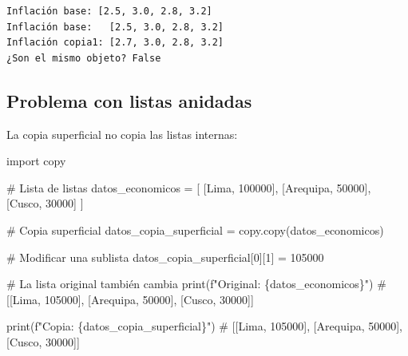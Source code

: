 \documentclass[
  doc,
  floatsintext,
  longtable,
  a4paper,
  nolmodern,
  notxfonts,
  notimes,
  12pt,
  colorlinks=true,linkcolor=blue,citecolor=blue,urlcolor=blue]{apa7}
\newenvironment{Shaded}{\begin{snugshade}}{\end{snugshade}}
\newcommand{\BuiltInTok}[1]{\textcolor[rgb]{0.00,0.23,0.31}{#1}}
\newcommand{\CommentTok}[1]{\textcolor[rgb]{0.37,0.37,0.37}{#1}}
\newcommand{\DecValTok}[1]{\textcolor[rgb]{0.68,0.00,0.00}{#1}}
\newcommand{\ImportTok}[1]{\textcolor[rgb]{0.00,0.46,0.62}{#1}}
\newcommand{\NormalTok}[1]{\textcolor[rgb]{0.00,0.23,0.31}{#1}}
\newcommand{\OperatorTok}[1]{\textcolor[rgb]{0.37,0.37,0.37}{#1}}
\newcommand{\SpecialCharTok}[1]{\textcolor[rgb]{0.37,0.37,0.37}{#1}}
\newcommand{\SpecialStringTok}[1]{\textcolor[rgb]{0.13,0.47,0.30}{#1}}
\newcommand{\StringTok}[1]{\textcolor[rgb]{0.13,0.47,0.30}{#1}}
\begin{document}
\begin{verbatim}
Inflación base: [2.5, 3.0, 2.8, 3.2]
Inflación base:   [2.5, 3.0, 2.8, 3.2]
Inflación copia1: [2.7, 3.0, 2.8, 3.2]
¿Son el mismo objeto? False
\end{verbatim}

\subsection{Problema con listas
anidadas}\label{problema-con-listas-anidadas}

La copia superficial no copia las listas internas:

\begin{Shaded}
\begin{Highlighting}[]
\ImportTok{import}\NormalTok{ copy}

\CommentTok{\# Lista de listas}
\NormalTok{datos\_economicos }\OperatorTok{=}\NormalTok{ [}
\NormalTok{    [}\StringTok{\textquotesingle{}Lima\textquotesingle{}}\NormalTok{, }\DecValTok{100000}\NormalTok{],}
\NormalTok{    [}\StringTok{\textquotesingle{}Arequipa\textquotesingle{}}\NormalTok{, }\DecValTok{50000}\NormalTok{],}
\NormalTok{    [}\StringTok{\textquotesingle{}Cusco\textquotesingle{}}\NormalTok{, }\DecValTok{30000}\NormalTok{]}
\NormalTok{]}

\CommentTok{\# Copia superficial}
\NormalTok{datos\_copia\_superficial }\OperatorTok{=}\NormalTok{ copy.copy(datos\_economicos)}

\CommentTok{\# Modificar una sublista}
\NormalTok{datos\_copia\_superficial[}\DecValTok{0}\NormalTok{][}\DecValTok{1}\NormalTok{] }\OperatorTok{=} \DecValTok{105000}

\CommentTok{\# La lista original también cambia}
\BuiltInTok{print}\NormalTok{(}\SpecialStringTok{f"Original: }\SpecialCharTok{\{}\NormalTok{datos\_economicos}\SpecialCharTok{\}}\SpecialStringTok{"}\NormalTok{)}
\CommentTok{\# [[\textquotesingle{}Lima\textquotesingle{}, 105000], [\textquotesingle{}Arequipa\textquotesingle{}, 50000], [\textquotesingle{}Cusco\textquotesingle{}, 30000]]}

\BuiltInTok{print}\NormalTok{(}\SpecialStringTok{f"Copia: }\SpecialCharTok{\{}\NormalTok{datos\_copia\_superficial}\SpecialCharTok{\}}\SpecialStringTok{"}\NormalTok{)}
\CommentTok{\# [[\textquotesingle{}Lima\textquotesingle{}, 105000], [\textquotesingle{}Arequipa\textquotesingle{}, 50000], [\textquotesingle{}Cusco\textquotesingle{}, 30000]]}
\end{Highlighting}
\end{Shaded}
\end{document}
